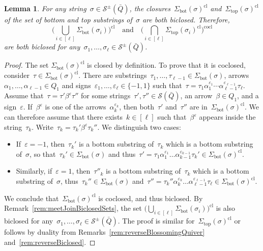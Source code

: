 \documentclass{memo-l}
\newtheorem{lemma}[theorem]{Lemma}
\theoremstyle{definition}
\newcommand{\strings}{\mathcal{S}} %
\renewcommand{\top}{\mathrm{top}} %
\newcommand{\bottom}{\mathrm{bot}} %
\newcommand{\closure}[1]{#1^{\mathrm{cl}}} %
\newcommand{\coclosure}[1]{#1^{\mathrm{cocl}}} %
\begin{document}
\begin{lemma}
\label{lem:exmBiclosed}
For any string~$\sigma \in \strings^\pm(\bar Q)$, the closures~$\closure{\Sigma_\bottom(\sigma)}$ and~$\closure{\Sigma_\top(\sigma)}$ of the set of bottom and top substrings of~$\sigma$ are both biclosed.
Therefore,
\[
\closure{\Big( \bigcup_{i \in [\ell]} \Sigma_\bottom(\sigma_i) \Big)}
\quad\text{and}\quad
\coclosure{\Big( \bigcap_{i \in [\ell]} \closure{\Sigma_\top(\sigma_i)} \Big)}
\]
are both biclosed for any~$\sigma_1, \dots, \sigma_\ell \in \strings^\pm(\bar Q)$.
\end{lemma}

\begin{proof}
The set $\closure{\Sigma_\bottom(\sigma)}$ is closed by definition.
To prove that it is coclosed, consider~${\tau \in \closure{\Sigma_\bottom(\sigma)}}$.
There are substrings~$\tau_1, \dots, \tau_{\ell-1} \in \Sigma_\bottom(\sigma)$, arrows $\alpha_1, \dots, \alpha_{\ell-1} \in Q_1$ and signs~${\varepsilon_1, \dots, \varepsilon_\ell \in \{-1,1\}}$ such that~$\tau = \tau_1 \alpha_1^{\varepsilon_1} \cdots \alpha_{\ell-1}^{\varepsilon_{\ell-1}} \tau_\ell$.
Assume that~$\tau = \tau' \beta^\varepsilon \tau''$ for some strings~$\tau', \tau'' \in \strings(\bar Q)$, an arrow~$\beta \in Q_1$, and a sign~$\varepsilon$.
If~$\beta^\varepsilon$ is one of the arrows~$\alpha_k^{\varepsilon_k}$, then both~$\tau'$ and~$\tau''$ are in~$\closure{\Sigma_\bottom(\sigma)}$.
We can therefore assume that there exists~$k \in [\ell]$ such that~$\beta^\varepsilon$ appears inside the string~$\tau_k$.
Write~$\tau_k = \tau_k' \beta^\varepsilon \tau_k''$.
We distinguish two cases:
\begin{itemize}
\item If~$\varepsilon = -1$, then~$\tau_k'$ is a bottom substring of~$\tau_k$ which is a bottom substring of~$\sigma$, so that~$\tau_k' \in \Sigma_\bottom(\sigma)$ and thus~$\tau' = \tau_1 \alpha_1^{\varepsilon_1} \dots \alpha_{k-1}^{\varepsilon_{k-1}} \tau_k' \in \closure{\Sigma_\bottom(\sigma)}$.
\item Similarly, if~$\varepsilon = 1$, then~$\tau''_k$ is a bottom substring of~$\tau_k$ which is a bottom substring of~$\sigma$, thus~$\tau_k'' \in \Sigma_\bottom(\sigma)$ and~${\tau'' = \tau_k'' \alpha_k^{\varepsilon_k} \dots \alpha_{\ell-1}^{\varepsilon_{\ell-1}} \tau_\ell \in \closure{\Sigma_\bottom(\sigma)}}$.
\end{itemize}
We conclude that~$\closure{\Sigma_\bottom(\sigma)}$ is coclosed, and thus biclosed.
By Remark~\ref{rem:meetJoinBiclosedSets}, the set $\closure{\big( \bigcup_{i \in [\ell]} \Sigma_\bottom(\sigma_i) \big)}$ is also biclosed for any~$\sigma_1, \dots, \sigma_\ell \in \strings^\pm(\bar Q)$.
The proof is similar for~$\closure{\Sigma_\top(\sigma)}$ or follows by duality from Remarks~\ref{rem:reverseBlossomingQuiver} and~\ref{rem:reverseBiclosed}.
\end{proof}
\end{document}
